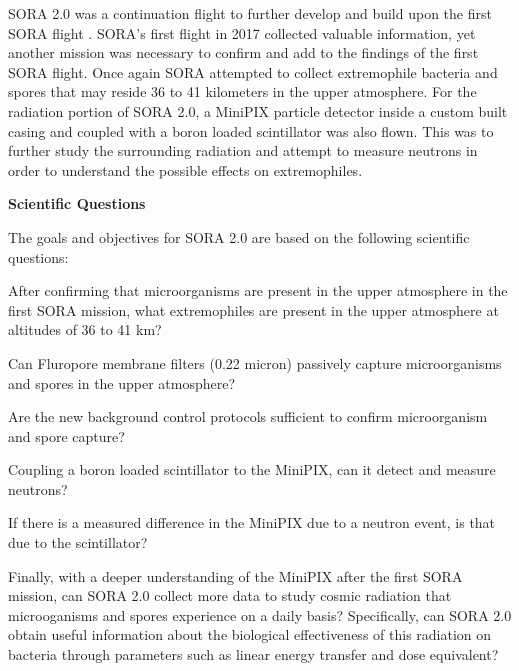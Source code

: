 SORA 2.0 was a continuation flight to further develop and build upon the first SORA flight \cite{SORA}.  SORA's first flight in 2017 collected valuable information, yet another mission was necessary to confirm and add to the findings of the first SORA flight.  Once again SORA attempted to collect extremophile bacteria and spores that may reside 36 to 41 kilometers in the upper atmosphere.  For the radiation portion of SORA 2.0, a MiniPIX particle detector inside a custom built casing and coupled with a boron loaded scintillator was also flown.  This was to further study the surrounding radiation and attempt to measure neutrons in order to understand the possible effects on extremophiles.  
 
{\bf Scientific Questions}

The goals and objectives for SORA 2.0 are based on the following scientific questions: 
%
\begin{itemize}
	{\indentitem \item After confirming that microorganisms are present in the upper atmosphere in the first SORA mission, what extremophiles are present in the upper atmosphere at altitudes of 36 to 41 km?}
	{\indentitem \item Can Fluropore membrane filters (0.22 micron) passively capture microorganisms and spores in the upper atmosphere?}
	{\indentitem \item Are the new background control protocols sufficient to confirm microorganism and spore capture?} 
	{\indentitem \item Coupling a boron loaded scintillator to the MiniPIX, can it detect and measure neutrons? } 
	{\indentitem \item If there is a measured difference in the MiniPIX due to a neutron event, is that due to the scintillator?}
	{\indentitem \item Finally, with a deeper understanding of the MiniPIX after the first SORA mission, can SORA 2.0 collect more data to study cosmic radiation that microoganisms and spores experience on a daily basis? Specifically, can SORA 2.0 obtain useful information about the biological effectiveness of this radiation on bacteria through parameters such as linear energy transfer and dose equivalent?}
\end{itemize}
%

